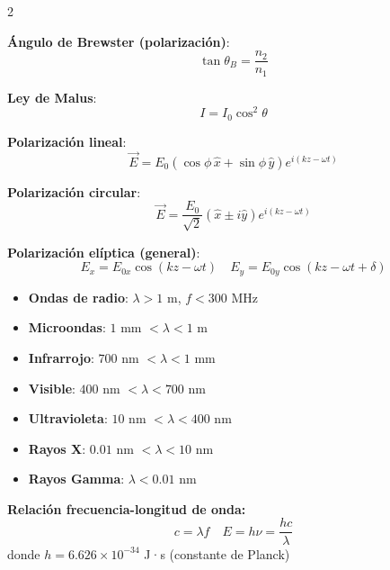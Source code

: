 \documentclass{article}
\begin{document}
\begin{multicols}{2}
\begin{itemform}
\item \textbf{Ángulo de Brewster (polarización)}:
$$\tan\theta_B = \frac{n_2}{n_1}$$
\end{itemform}


\begin{itemform}
\item \textbf{Ley de Malus}:
$$I = I_0\cos^2\theta$$

\item \textbf{Polarización lineal}:
$$\vec{E} = E_0(\cos\phi\,\hat{x} + \sin\phi\,\hat{y})e^{i(kz-\omega t)}$$

\item \textbf{Polarización circular}:
$$\vec{E} = \frac{E_0}{\sqrt{2}}(\hat{x} \pm i\hat{y})e^{i(kz-\omega t)}$$

\item \textbf{Polarización elíptica (general)}:
$$E_x = E_{0x}\cos(kz-\omega t) \quad E_y = E_{0y}\cos(kz-\omega t + \delta)$$
\end{itemform}


\begin{itemize}[leftmargin=*,noitemsep,topsep=0pt]
\item \textbf{Ondas de radio}: $\lambda > 1$ m, $f < 300$ MHz
\item \textbf{Microondas}: $1$ mm $< \lambda < 1$ m
\item \textbf{Infrarrojo}: $700$ nm $< \lambda < 1$ mm
\item \textbf{Visible}: $400$ nm $< \lambda < 700$ nm
\item \textbf{Ultravioleta}: $10$ nm $< \lambda < 400$ nm
\item \textbf{Rayos X}: $0.01$ nm $< \lambda < 10$ nm
\item \textbf{Rayos Gamma}: $\lambda < 0.01$ nm
\end{itemize}

\vspace{0.3cm}
\textbf{Relación frecuencia-longitud de onda:}
$$c = \lambda f \quad E = h\nu = \frac{hc}{\lambda}$$
donde $h = 6.626 \times 10^{-34}$ J·s (constante de Planck)

\end{multicols}
\end{document}
